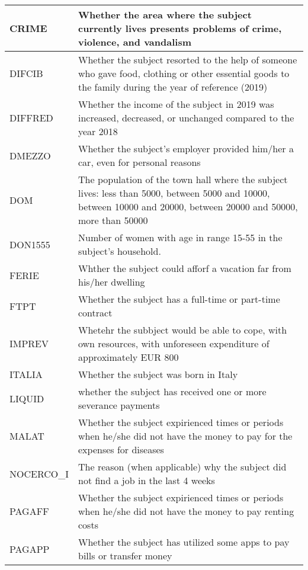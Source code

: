 \begin{appendices}
\begin{longtable}{ | m{4cm} | m{12cm}|}
    \hline
    CRIME &                 Whether the area where the subject currently lives  presents problems of crime, violence, and vandalism \\
    \hline
    DIFCIB &                 Whether the subject resorted to the help of someone who gave food, clothing or other essential goods to the family during the year of reference (2019)  \\
    \hline
    DIFFRED &                 Whether the income of the subject in 2019 was increased, decreased, or unchanged compared to the year 2018\\
    \hline
    DMEZZO &                 Whether the subject’s employer provided him/her a car, even for personal reasons \\
    \hline
    DOM &                 The population of the town hall where the subject lives: less than 5000, between 5000 and 10000, between 10000 and 20000, between 20000 and 50000, more than 50000 \\
    \hline
    DON1555 &                 Number of women with age in range 15-55 in the subject’s household. \\
    \hline
    FERIE &                 Whther the subject could afforf a vacation far from his/her dwelling \\
    \hline
    FTPT &                 Whether the subject has a full-time or part-time contract \\
    \hline
    IMPREV &              Whetehr the subbject would be able to cope, with own resources, with unforeseen expenditure of approximately EUR 800   \\
    \hline
    ITALIA &                 Whether the subject was born in Italy \\
    \hline
    LIQUID &                 whether the subject has received one or more severance payments \\
    \hline
    MALAT &                 Whether the subject expirienced times or periods when he/she did not have the money to pay for the expenses for diseases \\
    \hline
    NOCERCO\_I &                 The reason (when applicable) why the subject did not find a job in the last 4 weeks \\
    \hline
    PAGAFF &                 Whether the subject expirienced times or periods when he/she did not have the money to pay renting costs\\
    \hline
    PAGAPP &                 Whether the subject has utilized some apps to pay bills or transfer money \\

\end{longtable}
\end{appendices}
